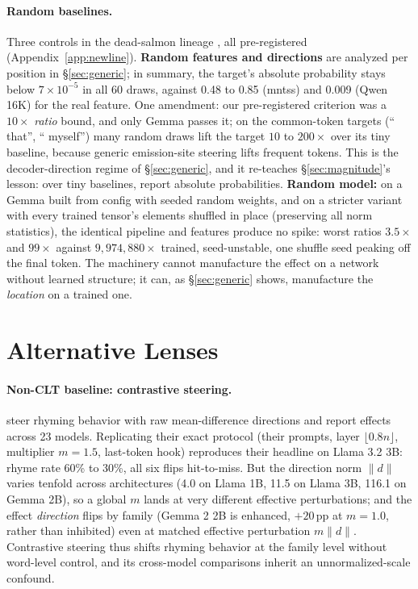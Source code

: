 \documentclass[11pt]{article}
\begin{document}
\paragraph{Random baselines.}
Three controls in the dead-salmon lineage \citep{meloux2025dead}, all pre-registered (Appendix~\ref{app:newline}). \textbf{Random features and directions} are analyzed per position in \S\ref{sec:generic}; in summary, the target's absolute probability stays below $7\times10^{-5}$ in all 60 draws, against 0.48 to 0.85 (mntss) and 0.009 (Qwen 16K) for the real feature. One amendment: our pre-registered criterion was a $10\times$ \emph{ratio} bound, and only Gemma passes it; on the common-token targets (`` that'', `` myself'') many random draws lift the target $10$ to $200\times$ over its tiny baseline, because generic emission-site steering lifts frequent tokens. This is the decoder-direction regime of \S\ref{sec:generic}, and it re-teaches \S\ref{sec:magnitude}'s lesson: over tiny baselines, report absolute probabilities. \textbf{Random model:} on a Gemma built from config with seeded random weights, and on a stricter variant with every trained tensor's elements shuffled in place (preserving all norm statistics), the identical pipeline and features produce no spike: worst ratios $3.5\times$ and $99\times$ against $9{,}974{,}880\times$ trained, seed-unstable, one shuffle seed peaking off the final token. The machinery cannot manufacture the effect on a network without learned structure; it can, as \S\ref{sec:generic} shows, manufacture the \emph{location} on a trained one.

\section{Alternative Lenses}
\label{sec:baselines}

\paragraph{Non-CLT baseline: contrastive steering.}
\citet{maar2026plan} steer rhyming behavior with raw mean-difference directions and report effects across 23 models. Replicating their exact protocol (their prompts, layer $\lfloor0.8n\rfloor$, multiplier $m{=}1.5$, last-token hook) reproduces their headline on Llama 3.2 3B: rhyme rate 60\% to 30\%, all six flips hit-to-miss. But the direction norm $\lVert d\rVert$ varies tenfold across architectures (4.0 on Llama 1B, 11.5 on Llama 3B, 116.1 on Gemma 2B), so a global $m$ lands at very different effective perturbations; and the effect \emph{direction} flips by family (Gemma 2 2B is enhanced, $+20$\,pp at $m{=}1.0$, rather than inhibited) even at matched effective perturbation $m\lVert d\rVert$. Contrastive steering thus shifts rhyming behavior at the family level without word-level control, and its cross-model comparisons inherit an unnormalized-scale confound.
\end{document}
